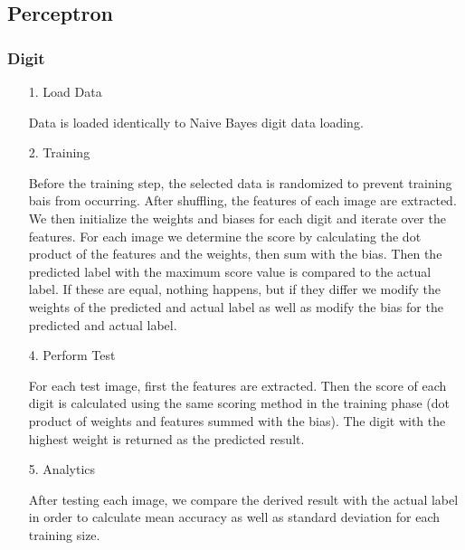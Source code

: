 \documentclass[12pt]{article}
\begin{document}
\subsection{Perceptron}

\subsubsection{Digit}
\begin{itemize}
    \item[1.] Load Data
    \item[] Data is loaded identically to Naive Bayes digit data loading.
    \item[2.] Training 
    \item[] Before the training step, the selected data is randomized to prevent training bais from occurring. After shuffling, the features of each image are extracted. We then initialize the weights and biases for each digit and iterate over the features. For each image we determine the score by calculating the dot product of the features and the weights, then sum with the bias. Then the predicted label with the maximum score value is compared to the actual label. If these are equal, nothing happens, but if they differ we modify the weights of the predicted and actual label as well as modify the bias for the predicted and actual label.
    \item[4.] Perform Test
    \item[] For each test image, first the features are extracted. Then the score of each digit is calculated using the same scoring method in the training phase (dot product of weights and features summed with the bias). The digit with the highest weight is returned as the predicted result.
    \item[5.] Analytics
    \item[] After testing each image, we compare the derived result with the actual label in order to calculate mean accuracy as well as standard deviation for each training size. 
\end{itemize}
\end{document}
